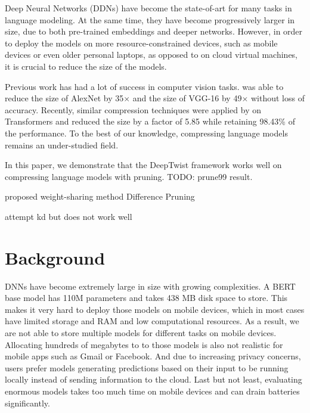 \documentclass[10pt]{article}
\begin{document}
Deep Neural Networks (DDNs) have become the state-of-art for many tasks in
language modeling. At the same time, they have become progressively larger in
size, due to both pre-trained embeddings and deeper networks.
However, in order to deploy the models on more resource-constrained devices,
such as mobile devices or even older personal laptops, as opposed to on cloud
virtual machines, it is crucial to reduce the size of the models.

Previous work has had a lot of success in computer vision tasks.
\citet{han2015deep} was able to reduce the size of AlexNet by 35$\times$ and
the size of VGG-16 by 49$\times$ without loss of accuracy.
Recently, similar compression techniques were applied by
\citet{cheong2014transformer} on Transformers and reduced the size by a factor
of 5.85 while retaining 98.43\% of the performance. To the best of our
knowledge, compressing language models remains an under-studied field.


In this paper, we demonstrate that the DeepTwist framework works well on
compressing language models with pruning. {\color{red} TODO: prune99 result}.

proposed weight-sharing method Difference Pruning

attempt kd but does not work well

\section{Background}


DNNs have become extremely large in size with growing complexities. A BERT
base model has 110M parameters and takes 438 MB disk space to store. This
makes it very hard to deploy those models on mobile devices, which in most
cases have limited storage and RAM and low computational resources. As a
result, we are not able to store multiple models for different tasks on mobile
devices. Allocating hundreds of megabytes to to those models is also not
realistic for mobile apps such as Gmail or Facebook. And due to increasing
privacy concerns, users prefer models generating predictions based on their
input to be running locally instead of sending information to the cloud. Last
but not least, evaluating enormous models takes too much time on mobile
devices and can drain batteries significantly.
\end{document}

